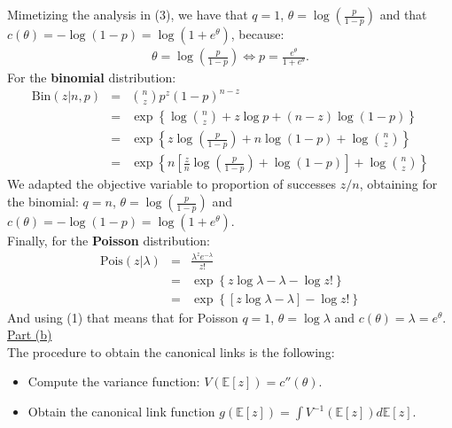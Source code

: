 \documentclass[a4paper, 11pt]{article}
\begin{document}
Mimetizing the analysis in (3), we have that $q=1$, $\theta = \log \left( \frac{p}{1-p} \right)$ and that $c(\theta) = -\log{(1-p)} = \log(1 + e^\theta)$, because:
\begin{eqnarray}
\theta = \log \left( \frac{p}{1-p} \right) \Leftrightarrow p = \frac{e^\theta}{1 + e^\theta}.
\end{eqnarray}
For the \textbf{binomial} distribution:
\begin{eqnarray}
\text{Bin}(z | n,p) &=& {n \choose z} p^z (1-p)^{n-z}   \nonumber \\
&=& \exp \left\{ \log{n \choose z} + z \log p + (n-z) \log{(1-p)} \right\} \nonumber \\
&=& \exp \left\{ z \log \left( \frac{p}{1-p} \right) + n \log{(1-p)} + \log{n \choose z} \right\} \nonumber \\
&=& \exp \left\{ n \left[ \frac{z}{n} \log\left( \frac{p}{1-p} \right) + \log{(1-p)} \right] + \log{n \choose z} \right\} \nonumber
\end{eqnarray}
We adapted the objective variable to proportion of successes $z/n$, obtaining for the binomial: $q=n$, $\theta = \log \left( \frac{p}{1-p} \right)$ and $c(\theta) = -\log{(1-p)} = \log(1 + e^\theta)$.\\
\newline Finally, for the \textbf{Poisson} distribution:
\begin{eqnarray}
\text{Pois}(z | \lambda) &=& \frac{\lambda^z e^{-\lambda}}{z!} \nonumber \\
&=& \exp \left\{ z \log \lambda - \lambda - \log z! \right\} \nonumber \\
&=& \exp \left\{ [z \log \lambda - \lambda] - \log z! \right\} \nonumber
\end{eqnarray}
And using (1) that means that for Poisson $q = 1$, $\theta = \log \lambda$ and $c(\theta) =\lambda = e^\theta$.\\
\newline \underline{Part (b)}\\
\newline The procedure to obtain the canonical links is the following:
\begin{itemize}
\item Compute the variance function: $V(\mathbb{E}[z]) = c''(\theta)$.
\item Obtain the canonical link function $g(\mathbb{E}[z]) = \int V^{-1}(\mathbb{E}[z]) d\mathbb{E}[z]$.
\end{itemize}
\end{document}

